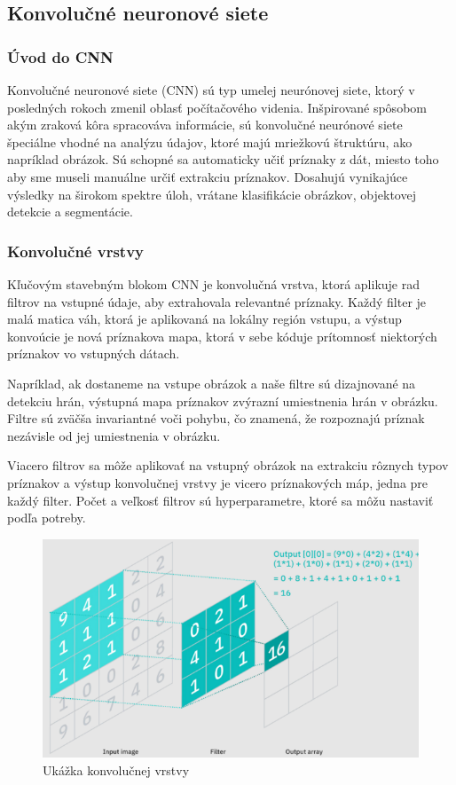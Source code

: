 \subsection{Konvolučné neuronové siete}

\subsubsection{Úvod do CNN}
\hspace{\parindent} Konvolučné neuronové siete (CNN) sú typ umelej neurónovej siete, ktorý v posledných rokoch zmenil oblasť počítačového videnia. 
Inšpirované spôsobom akým zraková kôra spracováva informácie, sú konvolučné neurónové siete špeciálne vhodné na analýzu údajov, ktoré majú mriežkovú štruktúru, ako napríklad obrázok. Sú schopné sa automaticky učiť príznaky z dát, miesto toho aby sme museli manuálne určiť extrakciu príznakov. Dosahujú vynikajúce výsledky na širokom spektre úloh, vrátane klasifikácie obrázkov, objektovej detekcie a segmentácie. 

\subsubsection{Konvolučné vrstvy}
\hspace{\parindent} Kľučovým stavebným blokom CNN je konvolučná vrstva, ktorá aplikuje rad filtrov na vstupné údaje, aby extrahovala relevantné príznaky. Každý filter je malá matica váh, ktorá je aplikovaná na lokálny región vstupu, a výstup konvoúcie je nová príznakova mapa, ktorá v sebe kóduje prítomnosť niektorých príznakov vo vstupných dátach. 

Napríklad, ak dostaneme na vstupe obrázok a naše filtre sú dizajnované na detekciu hrán, výstupná mapa príznakov zvýrazní umiestnenia hrán v obrázku. Filtre sú zväčša invariantné voči pohybu, čo znamená, že rozpoznajú príznak nezávisle od jej umiestnenia v obrázku. 

Viacero filtrov sa môže aplikovať na vstupný obrázok na extrakciu rôznych typov príznakov a výstup konvolučnej vrstvy je vicero príznakových máp, jedna pre každý filter. Počet a veľkosť filtrov sú hyperparametre, ktoré sa môžu nastaviť podľa potreby. 

\begin{figure}
\includegraphics{images/CNN-layer.resized.png}
\caption{Ukážka konvolučnej vrstvy}
\label{fig:image}
\end{figure}

